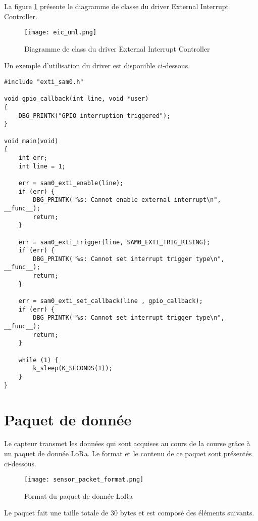 La figure \ref{fig:driver_eic_uml} présente le diagramme de classe du driver External Interrupt Controller.

\begin{figure}[htb]
\centering 
\texttt{[image: eic\_uml.png]} 
\caption{Diagramme de class du driver External Interrupt Controller}
\label{fig:driver_eic_uml}
\end{figure}

Un exemple d'utilisation du driver est disponible ci-dessous.

\begin{lstlisting}[style=CStyle]
#include "exti_sam0.h"

void gpio_callback(int line, void *user)
{
	DBG_PRINTK("GPIO interruption triggered");
}

void main(void)
{
	int err;
	int line = 1;

	err = sam0_exti_enable(line);
	if (err) {
		DBG_PRINTK("%s: Cannot enable external interrupt\n", __func__);
		return;	
	}
	
	err = sam0_exti_trigger(line, SAM0_EXTI_TRIG_RISING);
	if (err) {
		DBG_PRINTK("%s: Cannot set interrupt trigger type\n", __func__);
		return;	
	}

	err = sam0_exti_set_callback(line , gpio_callback);
	if (err) {
		DBG_PRINTK("%s: Cannot set interrupt trigger type\n", __func__);
		return;	
	}	

	while (1) {
		k_sleep(K_SECONDS(1));	
	}
}
\end{lstlisting}


\section{Paquet de donnée}\label{ch:paquet_donnee}

Le capteur transmet les données qui sont acquises au cours de la course grâce à un paquet de donnée LoRa. Le format et le contenu de ce paquet sont présentés ci-dessous.

\begin{figure}[htb]
\centering 
\texttt{[image: sensor\_packet\_format.png]} 
\caption{Format du paquet de donnée LoRa}
\label{fig:sensor_packet_format}
\end{figure}

Le paquet fait une taille totale de 30 bytes et est composé des éléments suivants.

